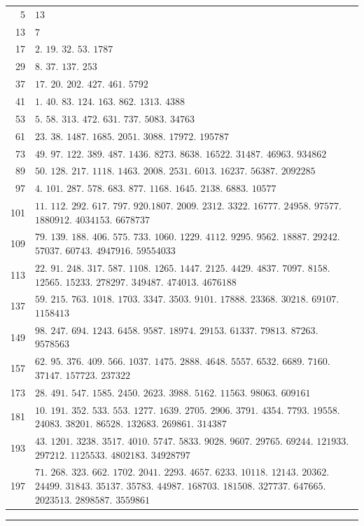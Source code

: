 \begin{longtable}{@{}r|p{\dimexpr\linewidth-38pt\relax}@{}}
5 & $13$\\
13 & $7$\\
17 & $2$. $19$. $32$. $53$. $1787$\\
29 & $8$. $37$. $137$. $253$\\
37 & $17$. $20$. $202$. $427$. $461$. $5792$\\
41 & $1$. $40$. $83$. $124$. $163$. $862$. $1313$. $4388$\\
53 & $5$. $58$. $313$. $472$. $631$. $737$. $5083$. $34763$\\
61 & $23$. $38$. $1487$. $1685$. $2051$. $3088$. $17972$. $195787$\\
73 & $49$. $97$. $122$. $389$. $487$. $1436$. $8273$. $8638$. $16522$. $31487$. $46963$. $934862$\\
89 & $50$. $128$. $217$. $1118$. $1463$. $2008$. $2531$. $6013$. $16237$. $56387$. $2092285$\\
97 & $4$. $101$. $287$. $578$. $683$. $877$. $1168$. $1645$. $2138$. $6883$. $10577$\\
101 & $11$. $112$. $292$. $617$. $797$. $920$.$1807$. $2009$. $2312$. $3322$. $16777$. $24958$. $97577$. $1880912$. $4034153$. $6678737$\\
109 & $79$. $139$. $188$. $406$. $575$. $733$. $1060$. $1229$. $4112$. $9295$. $9562$. $18887$. $29242$. $57037$. $60743$. $4947916$. $59554033$\\
113 & $22$. $91$. $248$. $317$. $587$. $1108$. $1265$. $1447$. $2125$. $4429$. $4837$. $7097$. $8158$. $12565$. $15233$. $278297$. $349487$. $474013$. $4676188$\\
137 & $59$. $215$. $763$. $1018$. $1703$. $3347$. $3503$. $9101$. $17888$. $23368$. $30218$. $69107$. $1158413$\\
149 & $98$. $247$. $694$. $1243$. $6458$. $9587$. $18974$. $29153$. $61337$. $79813$. $87263$. $9578563$\\
157 & $62$. $95$. $376$. $409$. $566$. $1037$. $1475$. $2888$. $4648$. $5557$. $6532$. $6689$. $7160$. $37147$. $157723$. $237322$\\
173 & $28$. $491$. $547$. $1585$. $2450$. $2623$. $3988$. $5162$. $11563$. $98063$. $609161$\\
181 & $10$. $191$. $352$. $533$. $553$. $1277$. $1639$. $2705$. $2906$. $3791$. $4354$. $7793$. $19558$. $24083$. $38201$. $86528$. $132683$. $269861$. $314387$\\
193 & $43$. $1201$. $3238$. $3517$. $4010$. $5747$. $5833$. $9028$. $9607$. $29765$. $69244$. $121933$. $297212$. $1125533$. $4802183$. $34928797$\\
197 & $71$. $268$. $323$. $662$. $1702$. $2041$. $2293$. $4657$. $6233$. $10118$. $12143$. $20362$. $24499$. $31843$. $35137$. $35783$. $44987$. $168703$. $181508$. $327737$. $647665$. $2023513$. $2898587$. $3559861$\\
\end{longtable}\endgroup
\par\medskip\begin{center}\rule{0.25\linewidth}{0.3pt}\end{center}
